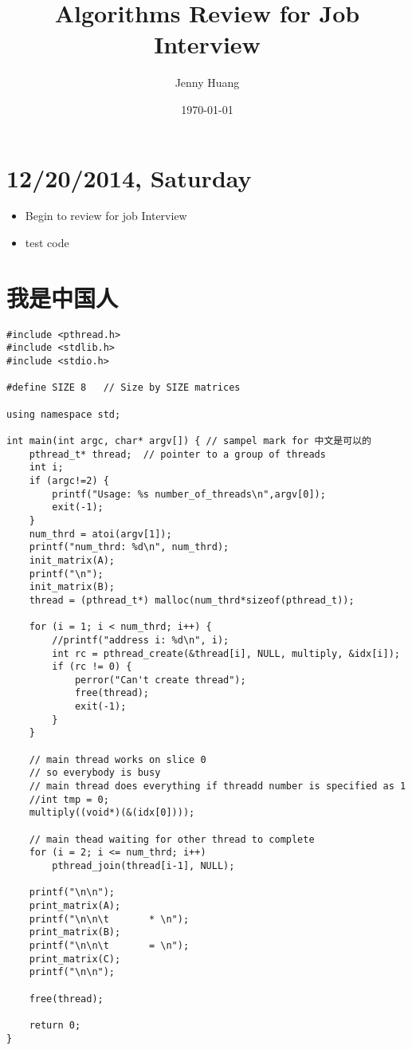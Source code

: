 \documentclass[9pt,b5paper]{article}
\author{Jenny Huang}
\date{\today}
\title{Algorithms Review for Job Interview}
\begin{document}
\maketitle
\tableofcontents


\section{12/20/2014, Saturday}
\label{sec-1}
\begin{itemize}
\item Begin to review for job Interview
\item test code
\end{itemize}

\section{我是中国人}
\label{sec-2}
\begin{lstlisting}
#include <pthread.h>
#include <stdlib.h>
#include <stdio.h>

#define SIZE 8   // Size by SIZE matrices

using namespace std;
 
int main(int argc, char* argv[]) { // sampel mark for 中文是可以的
    pthread_t* thread;  // pointer to a group of threads
    int i;
    if (argc!=2) {    
        printf("Usage: %s number_of_threads\n",argv[0]);
        exit(-1);
    }
    num_thrd = atoi(argv[1]);
    printf("num_thrd: %d\n", num_thrd);
    init_matrix(A);
    printf("\n");
    init_matrix(B);
    thread = (pthread_t*) malloc(num_thrd*sizeof(pthread_t));
    
    for (i = 1; i < num_thrd; i++) {    
        //printf("address i: %d\n", i);
        int rc = pthread_create(&thread[i], NULL, multiply, &idx[i]);
        if (rc != 0) {
            perror("Can't create thread");
            free(thread);
            exit(-1);
        }
    }
 
    // main thread works on slice 0
    // so everybody is busy
    // main thread does everything if threadd number is specified as 1
    //int tmp = 0;
    multiply((void*)(&(idx[0])));

    // main thead waiting for other thread to complete
    for (i = 2; i <= num_thrd; i++)
        pthread_join(thread[i-1], NULL);
 
    printf("\n\n");
    print_matrix(A);
    printf("\n\n\t       * \n");
    print_matrix(B);
    printf("\n\n\t       = \n");
    print_matrix(C);
    printf("\n\n");
 
    free(thread);
 
    return 0;
}
\end{lstlisting}
\end{document}
